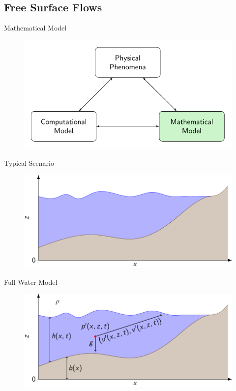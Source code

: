 \documentclass[pdf]{beamer}
\begin{document}
\subsection{Free Surface Flows}
\begin{frame}{Mathematical Model}
	\begin{figure}
		\includegraphics[width=\textwidth]{./Pics/ModelDiagrams/FlowChartHigh2G.pdf}
	\end{figure}
\end{frame}
\begin{frame}{Typical Scenario}
	\begin{figure}
		\includegraphics[width=\textwidth]{./Pics/WaterModelDiagrams/FressSurface.pdf}
	\end{figure}
\end{frame}
\begin{frame}{Full Water Model}
	\begin{figure}
		\includegraphics[width=\textwidth]{./Pics/WaterModelDiagrams/NavierStokes.pdf}
	\end{figure}
\end{frame}
\end{document}

